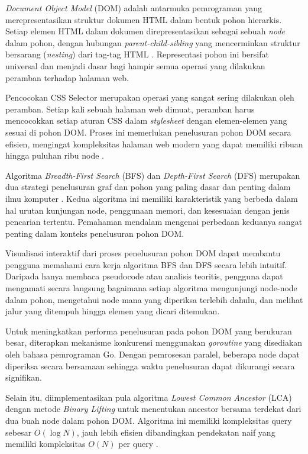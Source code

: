 \textit{Document Object Model} (DOM) adalah antarmuka pemrograman yang
merepresentasikan struktur dokumen HTML dalam bentuk pohon hierarkis.
Setiap elemen HTML dalam dokumen direpresentasikan sebagai sebuah \textit{node}
dalam pohon, dengan hubungan \textit{parent-child-sibling} yang mencerminkan
struktur bersarang (\textit{nesting}) dari tag-tag HTML \cite{mdn_dom}.
Representasi pohon ini bersifat universal dan menjadi dasar bagi hampir semua
operasi yang dilakukan peramban terhadap halaman web.

Pencocokan CSS Selector merupakan operasi yang sangat sering dilakukan oleh
peramban. Setiap kali sebuah halaman web dimuat, peramban harus mencocokkan
setiap aturan CSS dalam \textit{stylesheet} dengan elemen-elemen yang sesuai
di pohon DOM. Proses ini memerlukan penelusuran pohon DOM secara efisien,
mengingat kompleksitas halaman web modern yang dapat memiliki ribuan hingga
puluhan ribu node \cite{mdn_css_selectors}.

Algoritma \textit{Breadth-First Search} (BFS) dan \textit{Depth-First Search}
(DFS) merupakan dua strategi penelusuran graf dan pohon yang paling dasar dan
penting dalam ilmu komputer \cite{cormen2009introduction}. Kedua algoritma ini
memiliki karakteristik yang berbeda dalam hal urutan kunjungan node, penggunaan
memori, dan kesesuaian dengan jenis pencarian tertentu. Pemahaman mendalam
mengenai perbedaan keduanya sangat penting dalam konteks penelusuran pohon DOM.

Visualisasi interaktif dari proses penelusuran pohon DOM dapat membantu
pengguna memahami cara kerja algoritma BFS dan DFS secara lebih intuitif.
Daripada hanya membaca pseudocode atau analisis teoritis, pengguna dapat
mengamati secara langsung bagaimana setiap algoritma mengunjungi node-node
dalam pohon, mengetahui node mana yang diperiksa terlebih dahulu, dan melihat
jalur yang ditempuh hingga elemen yang dicari ditemukan.

Untuk meningkatkan performa penelusuran pada pohon DOM yang berukuran besar,
diterapkan mekanisme konkurensi menggunakan \textit{goroutine} yang disediakan
oleh bahasa pemrograman Go. Dengan pemrosesan paralel, beberapa node dapat
diperiksa secara bersamaan sehingga waktu penelusuran dapat dikurangi secara
signifikan.

Selain itu, diimplementasikan pula algoritma \textit{Lowest Common Ancestor}
(LCA) dengan metode \textit{Binary Lifting} untuk menentukan ancestor bersama
terdekat dari dua buah node dalam pohon DOM. Algoritma ini memiliki
kompleksitas query sebesar $O(\log N)$, jauh lebih efisien dibandingkan
pendekatan naif yang memiliki kompleksitas $O(N)$ per query
\cite{cpalgorithms_lca}.

